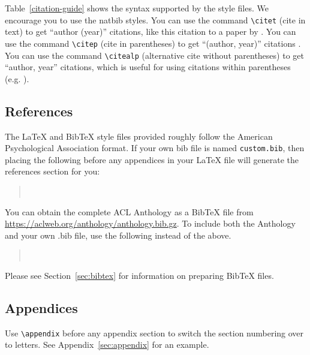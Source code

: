 \documentclass[11pt]{article}
\begin{document}
Table~\ref{citation-guide} shows the syntax supported by the style files.
We encourage you to use the natbib styles.
You can use the command \verb|\citet| (cite in text) to get ``author (year)'' citations, like this citation to a paper by \citet{Gusfield:97}.
You can use the command \verb|\citep| (cite in parentheses) to get ``(author, year)'' citations \citep{Gusfield:97}.
You can use the command \verb|\citealp| (alternative cite without parentheses) to get ``author, year'' citations, which is useful for using citations within parentheses (e.g. \citealp{Gusfield:97}).

\subsection{References}

\nocite{Ando2005,borschinger-johnson-2011-particle,andrew2007scalable,rasooli-tetrault-2015,goodman-etal-2016-noise,harper-2014-learning}

The \LaTeX{} and Bib\TeX{} style files provided roughly follow the American Psychological Association format.
If your own bib file is named \texttt{custom.bib}, then placing the following before any appendices in your \LaTeX{} file will generate the references section for you:
\begin{quote}
\begin{verbatim}


\end{verbatim}
\end{quote}

You can obtain the complete ACL Anthology as a Bib\TeX{} file from \url{https://aclweb.org/anthology/anthology.bib.gz}.
To include both the Anthology and your own .bib file, use the following instead of the above.
\begin{quote}
\begin{verbatim}


\end{verbatim}
\end{quote}

Please see Section~\ref{sec:bibtex} for information on preparing Bib\TeX{} files.

\subsection{Appendices}

Use \verb|\appendix| before any appendix section to switch the section numbering over to letters. See Appendix~\ref{sec:appendix} for an example.
\end{document}
